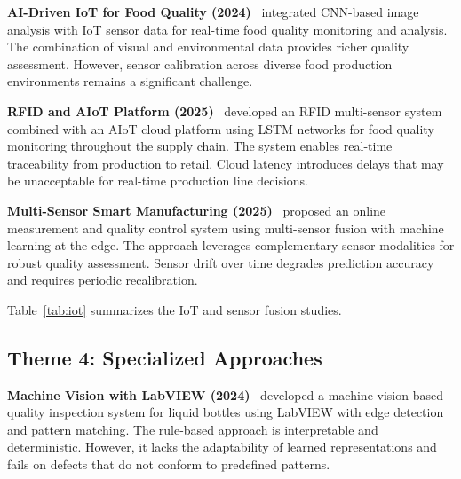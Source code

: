 \documentclass{ieeeaccess}
\begin{document}
\textbf{AI-Driven IoT for Food Quality (2024)}~\cite{aiot2024} integrated CNN-based image analysis with IoT sensor data for real-time food quality monitoring and analysis. The combination of visual and environmental data provides richer quality assessment. However, sensor calibration across diverse food production environments remains a significant challenge.

\textbf{RFID and AIoT Platform (2025)}~\cite{rfidaiot2025} developed an RFID multi-sensor system combined with an AIoT cloud platform using LSTM networks for food quality monitoring throughout the supply chain. The system enables real-time traceability from production to retail. Cloud latency introduces delays that may be unacceptable for real-time production line decisions.

\textbf{Multi-Sensor Smart Manufacturing (2025)}~\cite{smartmfg2025} proposed an online measurement and quality control system using multi-sensor fusion with machine learning at the edge. The approach leverages complementary sensor modalities for robust quality assessment. Sensor drift over time degrades prediction accuracy and requires periodic recalibration.

Table~\ref{tab:iot} summarizes the IoT and sensor fusion studies.

\begin{table}[!t]
\caption{Summary of IoT and Sensor Fusion Studies}
\label{tab:iot}
\centering
\small
{}
\end{table}


\subsection{Theme 4: Specialized Approaches}

\textbf{Machine Vision with LabVIEW (2024)}~\cite{machinevision2024} developed a machine vision-based quality inspection system for liquid bottles using LabVIEW with edge detection and pattern matching. The rule-based approach is interpretable and deterministic. However, it lacks the adaptability of learned representations and fails on defects that do not conform to predefined patterns.
\end{document}

